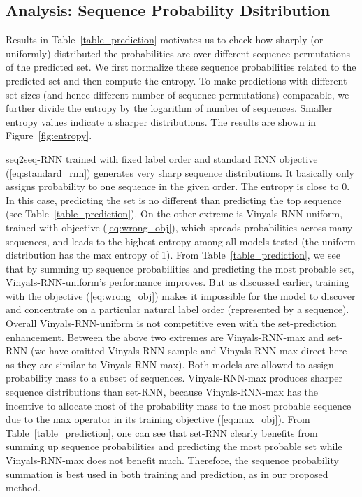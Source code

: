 \subsection{Analysis: Sequence Probability Dsitribution}
Results in Table~\ref{table_prediction} motivates us to check how sharply (or uniformly) distributed the probabilities are over different sequence permutations of the predicted set. We first normalize these sequence probabilities related to the predicted set and then compute the entropy. To make predictions with different set sizes (and hence different number of sequence permutations) comparable, we further divide the entropy by the logarithm of number of sequences. Smaller entropy values indicate a sharper distributions. The results are shown in Figure~\ref{fig:entropy}.

seq2seq-RNN trained with fixed label order and standard RNN objective (\ref{eq:standard_rnn}) generates very sharp sequence distributions. It basically only assigns probability to one sequence in the given order. The entropy is close to 0. In this case, predicting the set is no different than predicting the top sequence (see Table~\ref{table_prediction}). On the other extreme is Vinyals-RNN-uniform, trained with objective (\ref{eq:wrong_obj}), which spreads probabilities across many sequences, and leads to the highest entropy among all models tested (the uniform distribution has the max entropy of 1). From Table~\ref{table_prediction}, we see that by summing up sequence probabilities and predicting the most probable set,  Vinyals-RNN-uniform's performance  improves. But as  discussed earlier, training with the objective (\ref{eq:wrong_obj}) makes it impossible for the model to discover and concentrate on a particular natural label order (represented by a sequence). Overall Vinyals-RNN-uniform is not competitive even with the set-prediction enhancement. Between the above two extremes are Vinyals-RNN-max and set-RNN (we have omitted Vinyals-RNN-sample and Vinyals-RNN-max-direct here as they are similar to Vinyals-RNN-max). Both models are allowed to assign probability mass to a subset of sequences. Vinyals-RNN-max produces sharper sequence distributions than set-RNN, because  Vinyals-RNN-max has the incentive to allocate most of the probability mass to the most probable sequence due to the max operator in its training objective (\ref{eq:max_obj}). From Table~\ref{table_prediction}, one can see that set-RNN clearly benefits from summing up sequence probabilities and predicting the most probable set while Vinyals-RNN-max does not benefit much. Therefore, the sequence probability summation is best used in both training and prediction, as in our proposed method.

